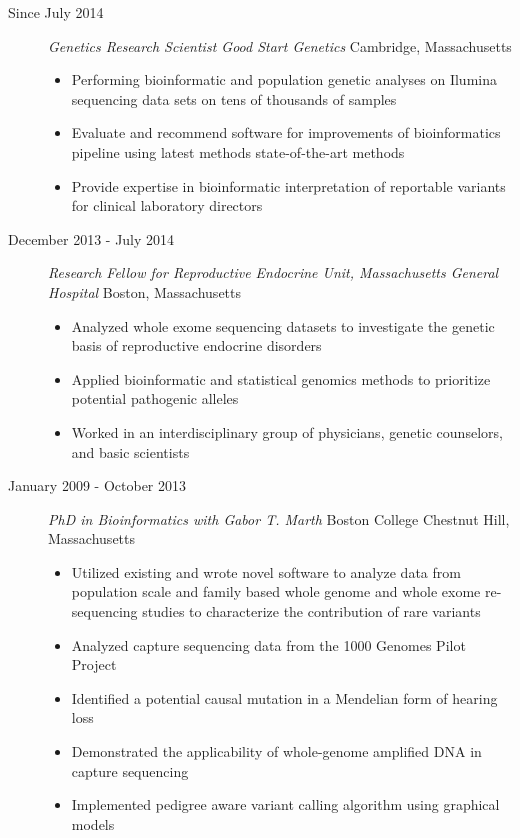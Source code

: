 \documentclass[]{article}
\begin{document}
\begin{description}
\item[Since July 2014]
\emph{Genetics Research Scientist
Good Start Genetics} Cambridge, Massachusetts

\begin{itemize}
  \item Performing bioinformatic and population genetic analyses on Ilumina sequencing data sets on tens of thousands of samples
  \item Evaluate and recommend software for improvements of bioinformatics pipeline using latest methods state-of-the-art methods
  \item Provide expertise in bioinformatic interpretation of reportable variants for clinical laboratory directors
\end{itemize}



\item[December 2013 - July 2014]
\emph{Research Fellow for
Reproductive
Endocrine Unit, Massachusetts General Hospital} Boston, Massachusetts

\begin{itemize}
	\item Analyzed whole exome sequencing datasets to investigate the  genetic basis of reproductive endocrine disorders
	\item Applied bioinformatic and statistical genomics methods to prioritize potential pathogenic alleles
	\item Worked in an interdisciplinary group of physicians, genetic counselors, and basic scientists
\end{itemize}
\newpage
\item[January 2009 - October 2013]
\emph{PhD in Bioinformatics with
Gabor
T. Marth} Boston College Chestnut Hill, Massachusetts

\begin{itemize}
	\item Utilized existing and wrote novel software to analyze data from
population scale and family based whole genome and whole exome
re-sequencing studies to characterize the contribution of rare variants
	\item Analyzed capture sequencing data from the 1000 Genomes Pilot Project
	\item  Identified a potential causal mutation in a Mendelian form of hearing loss
	\item Demonstrated the applicability of whole-genome amplified DNA in capture sequencing
	\item  Implemented pedigree aware variant calling algorithm using graphical models
\end{itemize}


\end{description}
\end{document}
